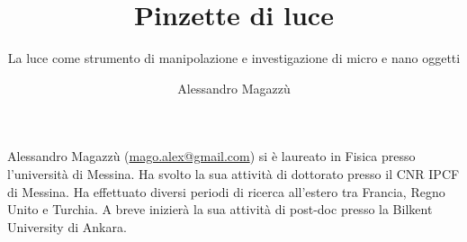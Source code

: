 ﻿\title{Pinzette di luce}
\subtitle{La luce come strumento di manipolazione e investigazione di micro e nano oggetti}
\suptitle{\phantom{x}}
\author{Alessandro Magazzù}
\maketitle
\begin{small}
\pichskip{4mm}
\nobalance



\vfill
\begin{thebiography}{}%
Alessandro Magazzù (\url{mago.alex@gmail.com}) si è laureato in Fisica presso l'università di Messina. Ha svolto la sua attività di dottorato presso il CNR IPCF di Messina.
Ha effettuato diversi periodi di ricerca all'estero tra Francia, Regno Unito e Turchia. A breve inizierà la sua attività di post-doc presso la Bilkent University di Ankara.
\end{thebiography}
\end{small}

